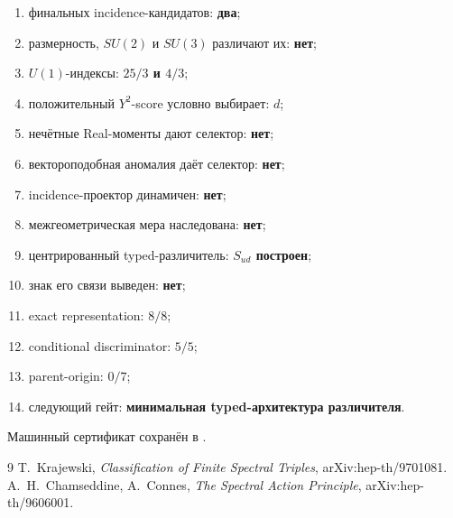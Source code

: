 \begin{protocol}\begin{enumerate}
\item финальных incidence-кандидатов: \textbf{два};
\item размерность, $SU(2)$ и $SU(3)$ различают их: \textbf{нет};
\item $U(1)$-индексы: \textbf{$25/3$ и $4/3$};
\item положительный $Y^2$-score условно выбирает: \textbf{$d$};
\item нечётные Real-моменты дают селектор: \textbf{нет};
\item вектороподобная аномалия даёт селектор: \textbf{нет};
\item incidence-проектор динамичен: \textbf{нет};
\item межгеометрическая мера наследована: \textbf{нет};
\item центрированный typed-различитель: \textbf{$S_{ud}$ построен};
\item знак его связи выведен: \textbf{нет};
\item exact representation: \textbf{$8/8$};
\item conditional discriminator: \textbf{$5/5$};
\item parent-origin: \textbf{$0/7$};
\item следующий гейт: \textbf{минимальная typed-архитектура различителя}.
\end{enumerate}\end{protocol}

Машинный сертификат сохранён в
.

\begin{thebibliography}{9}
 T.~Krajewski,
\emph{Classification of Finite Spectral Triples}, arXiv:hep-th/9701081.
 A.~H.~Chamseddine,
A.~Connes, \emph{The Spectral Action Principle}, arXiv:hep-th/9606001.
\end{thebibliography}